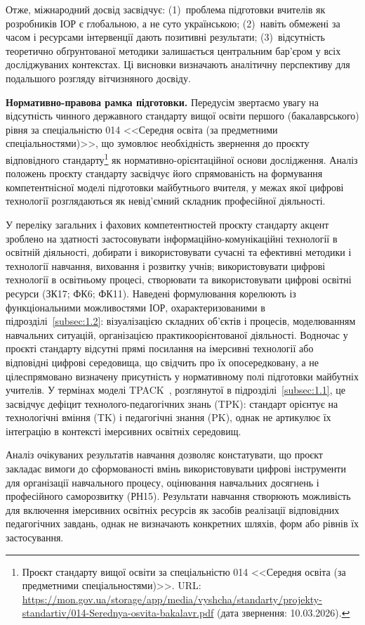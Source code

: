 Отже, міжнародний досвід засвідчує: (1)~проблема підготовки вчителів як розробників ІОР є глобальною, а не суто українською; (2)~навіть обмежені за часом і ресурсами інтервенції дають позитивні результати; (3)~відсутність теоретично обґрунтованої методики залишається центральним бар'єром у всіх досліджуваних контекстах. Ці висновки визначають аналітичну перспективу для подальшого розгляду вітчизняного досвіду.

\textbf{Нормативно-правова рамка підготовки.} Передусім звертаємо увагу на відсутність чинного державного стандарту вищої освіти першого (бакалаврського) рівня за спеціальністю 014 <<Середня освіта (за предметними спеціальностями)>>, що зумовлює необхідність звернення до проєкту відповідного стандарту\footnote{Проєкт стандарту вищої освіти за спеціальністю 014 <<Середня освіта (за предметними спеціальностями)>>. URL: \url{https://mon.gov.ua/storage/app/media/vyshcha/standarty/projekty-standartiv/014-Serednya-osvita-bakalavr.pdf} (дата звернення: 10.03.2026).} як нормативно-орієнтаційної основи дослідження. Аналіз положень проєкту стандарту засвідчує його спрямованість на формування компетентнісної моделі підготовки майбутнього вчителя, у межах якої цифрові технології розглядаються як невід'ємний складник професійної діяльності.

У переліку загальних і фахових компетентностей проєкту стандарту акцент зроблено на здатності застосовувати інформаційно-комунікаційні технології в освітній діяльності, добирати і використовувати сучасні та ефективні методики і технології навчання, виховання і розвитку учнів; використовувати цифрові технології в освітньому процесі, створювати та використовувати цифрові освітні ресурси (ЗК17; ФК6; ФК11). Наведені формулювання корелюють із функціональними можливостями ІОР, охарактеризованими в підрозділі~\ref{subsec:1.2}: візуалізацією складних об'єктів і процесів, моделюванням навчальних ситуацій, організацією практикоорієнтованої діяльності. Водночас у проєкті стандарту відсутні прямі посилання на імерсивні технології або відповідні цифрові середовища, що свідчить про їх опосередковану, а не цілеспрямовано визначену присутність у нормативному полі підготовки майбутніх учителів. У термінах моделі TPACK~\cite{BeldaMedina2022TPACK, Tan2023TPACK}, розглянутої в підрозділі~\ref{subsec:1.1}, це засвідчує дефіцит технолого-педагогічних знань (TPK): стандарт орієнтує на технологічні вміння (TK) і педагогічні знання (PK), однак не артикулює їх інтеграцію в контексті імерсивних освітніх середовищ.

Аналіз очікуваних результатів навчання дозволяє констатувати, що проєкт закладає вимоги до сформованості вмінь використовувати цифрові інструменти для організації навчального процесу, оцінювання навчальних досягнень і професійного саморозвитку (РН15). Результати навчання створюють можливість для включення імерсивних освітніх ресурсів як засобів реалізації відповідних педагогічних завдань, однак не визначають конкретних шляхів, форм або рівнів їх застосування.

